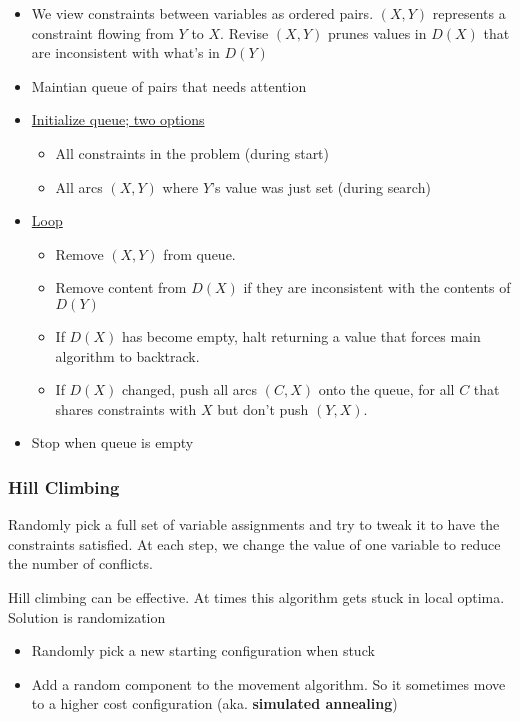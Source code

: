      \begin{itemize}
        \item We view constraints between variables as ordered pairs.
        $ \left( X, Y \right) $ represents a constraint flowing from $ Y $
        to $ X $. Revise $ \left( X, Y \right) $ prunes values in
        $ D\left( X \right) $ that are inconsistent with what's in
        $ D\left( Y \right) $

        \item Maintian queue of pairs that needs attention
        \item \ul{Initialize queue; two options}
        \begin{itemize}
          \item All constraints in the problem (during start)
          \item All arcs $ (X,Y) $ where $ Y $'s value was just set (during
          search)
        \end{itemize}

        \item \ul{Loop}
        \begin{itemize}
          \item Remove $ (X,Y) $ from queue.
          \item Remove content from $ D(X) $ if they are inconsistent with
          the contents of $ D(Y) $
          \item If $ D(X) $ has become empty, halt returning a value
          that forces main algorithm to backtrack.
          \item If $ D(X) $ changed, push all arcs $ (C,X) $ onto the queue,
          for all $ C $ that shares constraints with $ X $ but don't push $ (Y,X) $.
        \end{itemize}

        \item Stop when queue is empty
      \end{itemize}

    \subsubsection{Hill Climbing}

      Randomly pick a full set of variable assignments and try to tweak it
      to have the constraints satisfied. At each step, we change the value
      of one variable to reduce the number of conflicts.

      Hill climbing can be effective. At times this algorithm gets stuck in
      local optima. Solution is randomization
      \begin{itemize}
        \item Randomly pick a new starting configuration when stuck
        \item Add a random component to the movement algorithm. So it sometimes
        move to a higher cost configuration (aka. \textbf{simulated annealing})
      \end{itemize}